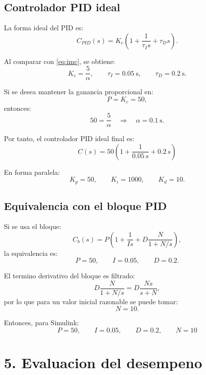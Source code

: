 \documentclass[11pt]{article}
\begin{document}
\subsection{Controlador PID ideal}

La forma ideal del PID es:
\begin{equation}
C_{PID}(s)=K_c\left(1+\frac{1}{\tau_I s}+\tau_D s\right).
\end{equation}

Al comparar con \eqref{eq:imc}, se obtiene:
\begin{equation}
K_c=\frac{5}{\alpha},\qquad
\tau_I=0.05\ \text{s},\qquad
\tau_D=0.2\ \text{s}.
\end{equation}

Si se desea mantener la ganancia proporcional en:
\[
P=K_c=50,
\]
entonces:
\begin{equation}
50=\frac{5}{\alpha}
\quad\Rightarrow\quad
\alpha=0.1\ \text{s}.
\end{equation}

Por tanto, el controlador PID ideal final es:
\begin{equation}
\boxed{
C(s)=50\left(1+\frac{1}{0.05\,s}+0.2\,s\right)
}
\label{eq:pidfinal}
\end{equation}

En forma paralela:
\[
K_p=50,\qquad K_i=1000,\qquad K_d=10.
\]

\subsection{Equivalencia con el bloque PID}

Si se usa el bloque:
\begin{equation}
C_b(s)=P\left(1+\frac{1}{Is}+D\frac{N}{1+N/s}\right),
\end{equation}
la equivalencia es:
\[
P=50,\qquad I=0.05,\qquad D=0.2.
\]

El termino derivativo del bloque es filtrado:
\[
D\frac{N}{1+N/s}
=
D\frac{Ns}{s+N},
\]
por lo que para un valor inicial razonable se puede tomar:
\[
N=10.
\]

Entonces, para Simulink:
\begin{equation}
\boxed{
P=50,\qquad I=0.05,\qquad D=0.2,\qquad N=10
}
\label{eq:pidsimulink}
\end{equation}

\section{5. Evaluacion del desempeno}
\end{document}
